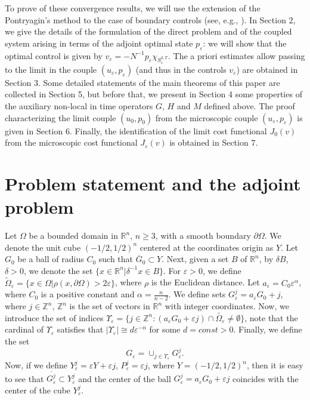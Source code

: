 \documentclass[reqno]{amsart}
\begin{document}
To prove of these convergence results, we will use the
extension of the Pontryagin's method to the case of boundary controls (see,
e.g., \cite{LionsOpt}). In Section 2, we give the details of the formulation
of the direct problem and of  the coupled system arising in terms of the
adjoint optimal state $p_{\varepsilon }$: we will show that the optimal
control is given by 
$v_{\varepsilon }=-N^{-1}p_{\varepsilon }\chi_{S_{\varepsilon }^{2,T}}$. 
The a priori estimates allow passing to the
limit in the couple $(u_{\varepsilon },p_{\varepsilon })$ (and thus in the
controls $v_{\varepsilon }$) are obtained in Section 3. Some detailed
statements of the main theorems of this paper are collected in Section 5,
but before that, we present in Section 4 some properties of the auxiliary
non-local in time operators $G$, $H$ and $M$ defined above. The proof
characterizing the limit couple $(u_0,p_0)$ from the microscopic couple 
$(u_{\varepsilon },p_{\varepsilon })$ is given in Section 6. Finally, the
identification of the limit cost functional $J_0(v)$ from the microscopic
cost functional $J_{\varepsilon }(v)$ is obtained in Section 7.

\section{Problem statement and the adjoint problem}

Let $\Omega $ be a bounded domain in $\mathbb{R}^n$, $n\geq 3$, with a
smooth boundary $\partial \Omega $. We denote the unit cube $(-1/2,1/2)^n$
centered at the coordinates origin as $Y$. Let $G_0$ be a ball of radius 
$C_0$ such that $\overline{G}_0\subset Y$. Next, given a set $B$ of 
$\mathbb{R}^n$, by $\delta B$, $\delta >0$, we denote the set $\{x\in
\mathbb{R}^n|\delta ^{-1}x\in B\}$. For $\varepsilon >0$, we define 
$\widetilde{\Omega }_{\varepsilon }=\{x\in \Omega |\rho (x,\partial \Omega
)>2\varepsilon \}$, where $\rho $ is the Euclidean distance. 
Let $a_{\varepsilon }=C_0\varepsilon ^{\alpha }$, where $C_0$ is a positive
constant and $\alpha =\frac{n}{n-2}$. We define sets 
$G_{\varepsilon}^{j}=a_{\varepsilon }G_0+j$, where $j\in \mathbb{Z}^n$, $\mathbb{Z}^n$
is the set of vectors in $\mathbb{R}^n$ with integer coordinates. Now, we
introduce the set of indices $\Upsilon _{\varepsilon }=\{j\in \mathbb{Z}
^n:(a_{\varepsilon }G_0+{\varepsilon }j)\cap \widetilde{\Omega
_{\varepsilon }}\neq \emptyset \}$, note that the cardinal of 
$\Upsilon_{\varepsilon }$ satisfies that 
$|\Upsilon _{\varepsilon }|\cong d{\varepsilon }^{-n}$ for some $d=const>0$. 
Finally, we define the set
\[
G_{\varepsilon }=\cup_{j\in \Upsilon _{\varepsilon }}G_{\varepsilon }^{j}.
\]
Now, if we define $Y_{\varepsilon }^{j}={\varepsilon }Y+{\varepsilon }j$,
$P_{\varepsilon }^{j}={\varepsilon }j$, where $Y=(-1/2,1/2)^n$, then it is
easy to see that $\overline{G_{\varepsilon }^{j}}\subset Y_{\varepsilon }^{j}$
and the center of the ball $G_{\varepsilon }^{j}=a_{\varepsilon }G_0+{\varepsilon }j$
coincides with the center of the cube $Y_{\varepsilon }^{j}$.
\end{document}
